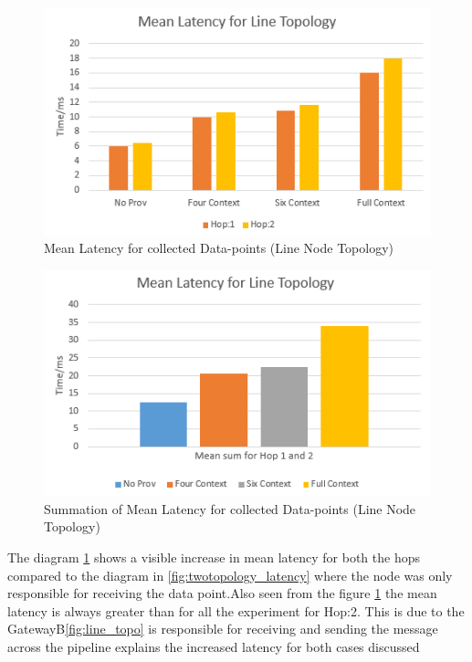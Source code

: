 \begin{figure}[H]
	\center
	\includegraphics[width=\textwidth]{figures/LineTopology_latency.PNG}
	\caption{Mean Latency for collected Data-points   (Line Node Topology)}
	\label{fig:linetopology_latency}
\end{figure}


\begin{figure}[H]
	\center
	\includegraphics[width=\textwidth]{figures/LineTopology_latency_sum.PNG}
	\caption{Summation of Mean Latency for collected Data-points   (Line Node Topology)}
	\label{fig:linetopology_sum_latency}
\end{figure}

The diagram \ref{fig:linetopology_latency}  shows a visible increase in mean latency for both the hops compared to the diagram in \ref{fig:twotopology_latency} where the node was only responsible for receiving the data point.Also seen from the figure \ref{fig:linetopology_latency} the mean latency is always greater than for all the experiment for Hop:2. This is due to the GatewayB\ref{fig:line_topo} is responsible for receiving and sending the message across the pipeline explains the increased latency for both cases discussed

